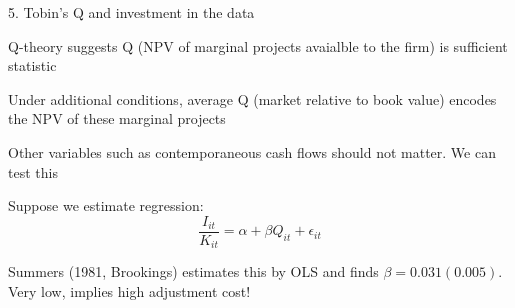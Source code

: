 \documentclass[11pt, aspectratio=169]{beamer}
\newenvironment{witemize}{\itemize\addtolength{\itemsep}{10pt}}{\enditemize}
\begin{document}
\begin{frame}{5. Tobin's Q and investment in the data}
\begin{witemize}
\item Q-theory suggests Q (NPV of marginal projects avaialble to the firm) is sufficient statistic

\item Under additional conditions, average Q (market relative to book value) encodes the NPV of these marginal projects

\item Other variables such as contemporaneous cash flows should not matter. We can test this 

\item Suppose we estimate regression:
\begin{equation*}
	\frac{I_{it}}{K_{it}} = \alpha + \beta Q_{it} + \epsilon_{it}	
\end{equation*}

\item Summers (1981, Brookings) estimates this by OLS and finds $\beta = 0.031 (0.005)$. Very low, implies high adjustment cost!

\end{witemize}
\end{frame}
\end{document}
